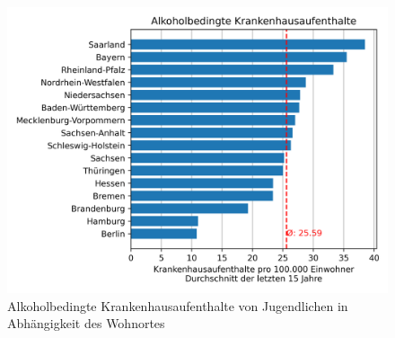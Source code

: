 \documentclass[12pt]{article}
\begin{document}
\begin{figure}[H]
    \centering
    \includegraphics[scale=.7]{"assets/Alkohol_Wohnort_avg_15_Jahre.png"}
    \caption{Alkoholbedingte Krankenhausaufenthalte von Jugendlichen in Abhängigkeit des Wohnortes}
    \label{fig:Krankenhausaufenthalte_2}
\end{figure}
\end{document}
